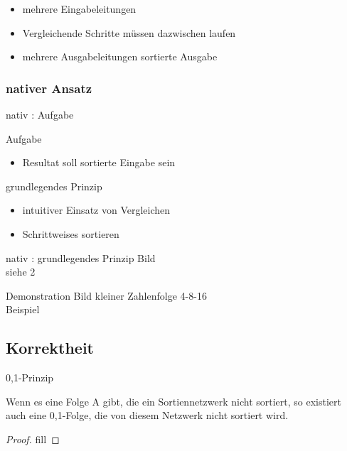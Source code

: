 \documentclass[ucs,9pt]{beamer}
\begin{document}
\begin{frame}
    \begin{itemize}
        \item mehrere Eingabeleitungen
        \item Vergleichende Schritte müssen dazwischen laufen
        \item mehrere Ausgabeleitungen sortierte Ausgabe
    \end{itemize}
\end{frame}

\subsubsection*{nativer Ansatz}
\begin{frame}{nativ : Aufgabe}
\begin{semiverbatim}
     {Aufgabe
        \begin{itemize}
            \item Resultat soll sortierte Eingabe sein
            \end{itemize}}
     {\item grundlegendes Prinzip
        \begin{itemize}
            \item intuitiver Einsatz von Vergleichen
            \item Schrittweises sortieren
        \end{itemize}}
\end{semiverbatim}
\end{frame}

\begin{frame}{nativ : grundlegendes Prinzip}
    Bild \\
    siehe 2 
\end{frame}

\begin{frame}{Demonstration}
    Bild kleiner Zahlenfolge 4-8-16\\
    Beispiel
\end{frame}

\subsection{Korrektheit}
\begin{frame}{0,1-Prinzip}
\begin{theorem} 
Wenn es eine Folge A gibt, die ein Sortiennetzwerk nicht sortiert, so existiert auch eine 0,1-Folge, die von diesem Netzwerk nicht sortiert wird.
\end{theorem}
\begin{proof}
{\color{red} fill}
\end{proof}
\end{frame}
\end{document}
